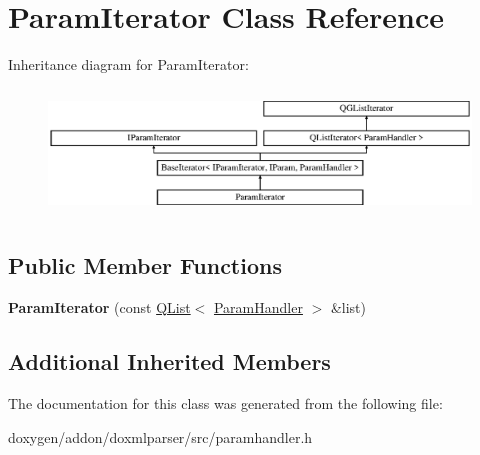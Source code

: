\hypertarget{class_param_iterator}{}\section{Param\+Iterator Class Reference}
\label{class_param_iterator}
Inheritance diagram for Param\+Iterator\+:\begin{figure}[H]
\begin{center}
\leavevmode
\includegraphics[height=3.404255cm]{class_param_iterator}
\end{center}
\end{figure}
\subsection*{Public Member Functions}
\begin{DoxyCompactItemize}
\item 
\mbox{\label{class_param_iterator_a5d946ca5d79e6138d5dcbc1a3fd43344}} 
{\bfseries Param\+Iterator} (const \mbox{\hyperlink{class_q_list}{Q\+List}}$<$ \mbox{\hyperlink{class_param_handler}{Param\+Handler}} $>$ \&list)
\end{DoxyCompactItemize}
\subsection*{Additional Inherited Members}


The documentation for this class was generated from the following file\+:\begin{DoxyCompactItemize}
\item 
doxygen/addon/doxmlparser/src/paramhandler.\+h\end{DoxyCompactItemize}
